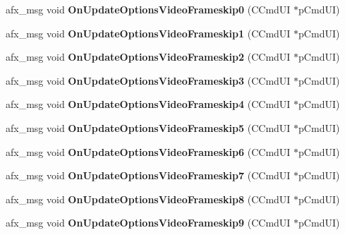 \begin{DoxyCompactItemize}
afx\+\_\+msg void {\bfseries On\+Update\+Options\+Video\+Frameskip0} (C\+Cmd\+UI $\ast$p\+Cmd\+UI)
\item 
\mbox{\label{class_main_wnd_a7f66c2de8b4946bd0c48b8124365cbfd}} 
afx\+\_\+msg void {\bfseries On\+Update\+Options\+Video\+Frameskip1} (C\+Cmd\+UI $\ast$p\+Cmd\+UI)
\item 
\mbox{\label{class_main_wnd_ab6f8fbd462e7b2079a185074d54c205c}} 
afx\+\_\+msg void {\bfseries On\+Update\+Options\+Video\+Frameskip2} (C\+Cmd\+UI $\ast$p\+Cmd\+UI)
\item 
\mbox{\label{class_main_wnd_a700b4eb8a69599721b04abba60a9aad8}} 
afx\+\_\+msg void {\bfseries On\+Update\+Options\+Video\+Frameskip3} (C\+Cmd\+UI $\ast$p\+Cmd\+UI)
\item 
\mbox{\label{class_main_wnd_a793b2ef26a9ac27dbfb59dbf86175207}} 
afx\+\_\+msg void {\bfseries On\+Update\+Options\+Video\+Frameskip4} (C\+Cmd\+UI $\ast$p\+Cmd\+UI)
\item 
\mbox{\label{class_main_wnd_ae097e4242099e9486304041874aea0dc}} 
afx\+\_\+msg void {\bfseries On\+Update\+Options\+Video\+Frameskip5} (C\+Cmd\+UI $\ast$p\+Cmd\+UI)
\item 
\mbox{\label{class_main_wnd_a741975d106105e7fb2dd0e9b6626b972}} 
afx\+\_\+msg void {\bfseries On\+Update\+Options\+Video\+Frameskip6} (C\+Cmd\+UI $\ast$p\+Cmd\+UI)
\item 
\mbox{\label{class_main_wnd_a3d78f5ca60b11eae68cdc77c4a404331}} 
afx\+\_\+msg void {\bfseries On\+Update\+Options\+Video\+Frameskip7} (C\+Cmd\+UI $\ast$p\+Cmd\+UI)
\item 
\mbox{\label{class_main_wnd_ab25f2cb1c1aca7a47fccb953ee77d6ae}} 
afx\+\_\+msg void {\bfseries On\+Update\+Options\+Video\+Frameskip8} (C\+Cmd\+UI $\ast$p\+Cmd\+UI)
\item 
\mbox{\label{class_main_wnd_af7fce43b8808d14ab4de5b3e23c3db49}} 
afx\+\_\+msg void {\bfseries On\+Update\+Options\+Video\+Frameskip9} (C\+Cmd\+UI $\ast$p\+Cmd\+UI)
\item 

\end{DoxyCompactItemize}
